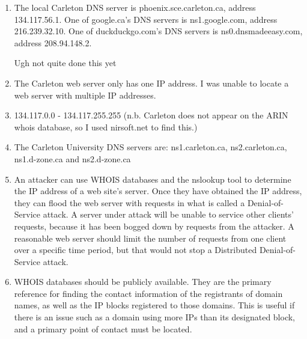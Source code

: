 \documentclass{article}
\begin{document}
\begin{enumerate}
\begin{enumerate}
\item The local Carleton DNS server is phoenix.sce.carleton.ca, address 134.117.56.1. One of google.ca's DNS servers is ns1.google.com, address 216.239.32.10. One of duckduckgo.com's DNS servers is ns0.dnsmadeeasy.com, address 208.94.148.2.

Ugh not quite done this yet

\item The Carleton web server only has one IP address. I was unable to locate a web server with multiple IP addresses.

\item 134.117.0.0 - 134.117.255.255 (n.b. Carleton does not appear on the ARIN whois database, so I used nirsoft.net to find this.)

\item The Carleton University DNS servers are: ns1.carleton.ca, ns2.carleton.ca, ns1.d-zone.ca and ns2.d-zone.ca

\item An attacker can use WHOIS databases and the nslookup tool to determine the IP address of a web site's server. Once they have obtained the IP address, they can flood the web server with requests in what is called a Denial-of-Service attack. A server under attack will be unable to service other clients' requests, because it has been bogged down by requests from the attacker. A reasonable web server should limit the number of requests from one client over a specific time period, but that would not stop a Distributed Denial-of-Service attack.

\item WHOIS databases should be publicly available. They are the primary reference for finding the contact information of the registrants of domain names, as well as the IP blocks registered to those domains. This is useful if there is an issue such as a domain using more IPs than its designated block, and a primary point of contact must be located.

\end{enumerate}

\end{enumerate}
\end{document}
